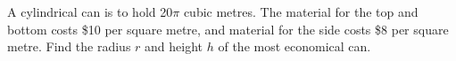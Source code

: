 \begin{frame}[t]
 A cylindrical can is to hold 20$\pi$ cubic metres. The material for the top and bottom costs \$10 per square metre, and material for the side costs \$8 per square metre. Find the radius $r$ and height $h$ of the most economical can.\pause\color{answercolor}\vfill
 
\end{frame}


